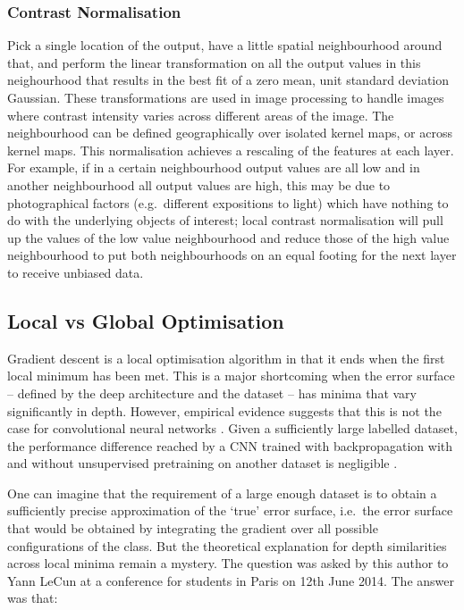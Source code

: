 \documentclass[a4paper,11pt]{article}
\begin{document}
\subsubsection{Contrast Normalisation}

Pick a single location of the output, have a little spatial neighbourhood around that, and perform the linear transformation on all the output values in this neighourhood that results in the best fit of a zero mean, unit standard deviation Gaussian. These transformations are used in image processing to handle images where contrast intensity varies across different areas of the image. The neighbourhood can be defined geographically over isolated kernel maps, or across kernel maps. This normalisation achieves a rescaling of the features at each layer. For example, if in a certain neighbourhood output values are all low and in another neighbourhood all output values are high, this may be due to photographical factors (e.g.\ different expositions to light) which have nothing to do with the underlying objects of interest; local contrast normalisation will pull up the values of the low value neighbourhood and reduce those of the high value neighbourhood to put both neighbourhoods on an equal footing for the next layer to receive unbiased data. \\


\subsection{Local vs Global Optimisation}

Gradient descent is a local optimisation algorithm in that it ends when the first local minimum has been met. This is a major shortcoming when the error surface -- defined by the deep architecture and the dataset -- has minima that vary significantly in depth. However, empirical evidence suggests that this is not the case for convolutional neural networks \cite{DL-book}. Given a sufficiently large labelled dataset, the performance difference reached by a CNN trained with backpropagation with and without unsupervised pretraining on another dataset is negligible \cite{rectifier}. 

One can imagine that the requirement of a large enough dataset is to obtain a sufficiently precise approximation of the `true' error surface, i.e.\ the error surface that would be obtained by integrating the gradient over all possible configurations of the class. But the theoretical explanation for depth similarities across local minima remain a mystery. The question was asked by this author to Yann LeCun at a conference for students in Paris on 12th June 2014. The answer was that: 
\end{document}

